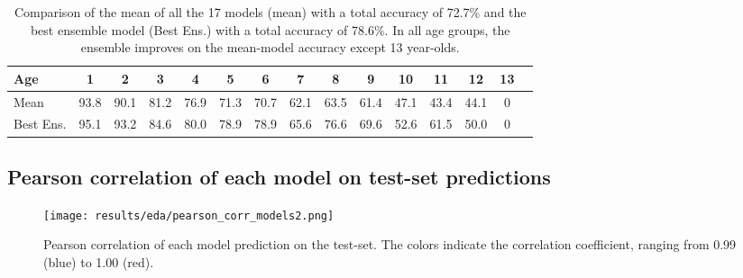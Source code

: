 \documentclass[10pt,letterpaper]{article}
\begin{document}
\centering
\begin{center}
\begin{table}[hbt!]
\caption{Comparison of the mean of all the 17 models (mean) with a total accuracy of 72.7\% and 
the best ensemble model (Best Ens.) with a total accuracy of 78.6\%. In all age groups, the
ensemble improves on the mean-model accuracy except 13 year-olds.}
\setlength\tabcolsep{3.5pt} %
\begin{tabular}{ |l|c|c|c|c|c|c|c|c|c|c|c|c|c|c| }
\hline
Age        & 1    & 2    & 3    & 4    & 5    & 6    & 7    &  8   & 9  & 10   & 11   & 12   & 13   \\ \hline
Mean       & 93.8 & 90.1 & 81.2 & 76.9 & 71.3 & 70.7 & 62.1 & 63.5 & 61.4 & 47.1 & 43.4 & 44.1 & 0 \\ 
Best Ens.  & 95.1 & 93.2 & 84.6 & 80.0 & 78.9 & 78.9 & 65.6 & 76.6 & 69.6 & 52.6 & 61.5 & 50.0 & 0 \\ \hline
\end{tabular}
\label{table9}
\end{table}
\end{center}

\pagebreak

\subsection{Pearson correlation of each model on test-set predictions}
\centering

\begin{figure}[ht!]

  \centering
  \texttt{[image: results/eda/pearson\_corr\_models2.png]}
    \caption{Pearson correlation of each model prediction on the test-set. The colors indicate the correlation coefficient, ranging from 0.99 (blue) to 1.00 (red).}
  \label{marker9}    
\end{figure}

\pagebreak
\end{document}
